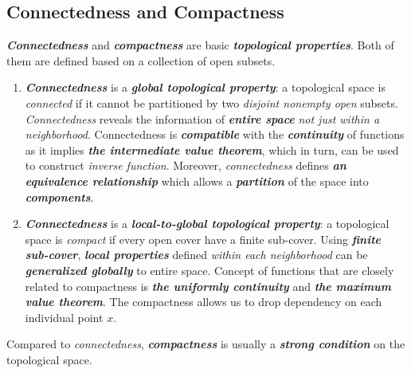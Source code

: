 \documentclass[11pt]{article}
\begin{document}
\subsection{Connectedness and Compactness}
 \begin{remark}
\emph{\textbf{Connectedness}} and \emph{\textbf{compactness}} are basic \emph{\textbf{topological properties}}. Both of them are defined based on a collection of open subsets. 
\begin{enumerate}
\item \emph{\textbf{Connectedness}} is a \emph{\textbf{global topological property}}: a topological space is \emph{connected} if it cannot be partitioned by two \emph{disjoint nonempty open} subsets. \emph{Connectedness} reveals the information of \emph{\textbf{entire space}} \emph{not just within a neighborhood}.  Connectedness is \emph{\textbf{compatible}} with the \emph{\textbf{continuity}} of functions as it implies \emph{\textbf{the intermediate value theorem}}, which in turn, can be used to construct \emph{inverse function}.  Moreover, \emph{connectedness} defines \emph{\textbf{an equivalence relationship}} which allows a \emph{\textbf{partition}} of the space into \emph{\textbf{components}}. 
\item \emph{\textbf{Connectedness}} is a \emph{\textbf{local-to-global topological property}}: a topological space is \emph{compact} if every open cover have a finite sub-cover. Using \emph{\textbf{finite sub-cover}}, \emph{\textbf{local properties}} defined \emph{within each neighborhood} can be \emph{\textbf{generalized globally}}  to entire space. Concept of functions that are closely related to compactness is \emph{\textbf{the uniformly continuity}} and \emph{\textbf{the maximum value theorem}}. The compactness allows us to drop dependency on each individual point $x$.
\end{enumerate}
Compared to \emph{connectedness}, \emph{\textbf{compactness}} is usually a \emph{\textbf{strong condition}} on the topological space.
\end{remark}
\end{document}
